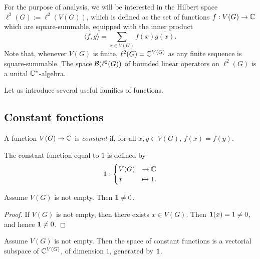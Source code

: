 For the purpose of analysis, we will be interested in the Hilbert space $\ell^2(G) := \ell^2(V(G))$,
which is defined as the set of functions $f : V(G) \rightarrow \mathbb{C}$ which are square-summable,
equipped with the inner product
$$\langle f, g \rangle = \sum_{x \in V(G)} f(x) \overline{g(x)}.$$
Note that, whenever $V(G)$ is finite, $\ell^2(G) = \mathbb{C}^{V(G)}$ as any finite sequence is
square-summable.
The space $\mathcal{B}(\ell^2(G))$ of bounded linear operators on $\ell^2(G)$ is a unital $\mathbb{C}^*$-algebra.

Let us introduce several useful families of functions.

\subsection{Constant fonctions}

\begin{definition}
  \label{def:constant_function}
  A function $V(G) \rightarrow \mathbb{C}$ is \emph{constant} if, for all $x, y \in V(G)$,
  $f(x)=f(y)$.
\end{definition}

\begin{definition}
  \label{def:constant_one}
  The constant function equal to $1$ is defined by
  \begin{equation}
    \mathbf{1} :
    \begin{cases}
      V(G) & \rightarrow \mathbb{C} \\
      x & \mapsto 1.
    \end{cases}
  \end{equation}
\end{definition}

\begin{lemma}
  \label{lem:one_neq_zero}
  Assume $V(G)$ is not empty. Then $\mathbf{1} \neq 0$.
\end{lemma}

\begin{proof}
  If $V(G)$ is not empty, then there exists $x \in V(G)$.
  Then $\mathbf{1} (x) = 1 \neq 0$, and hence $\mathbf{1} \neq 0$.
\end{proof}

\begin{theorem}
  \label{thm:space_constant}
  Assume $V(G)$ is not empty. Then the space of constant functions is
  a vectorial subspace of $\mathbb{C}^{V(G)}$, of dimension $1$, generated by $\mathbf{1}$.
\end{theorem}

